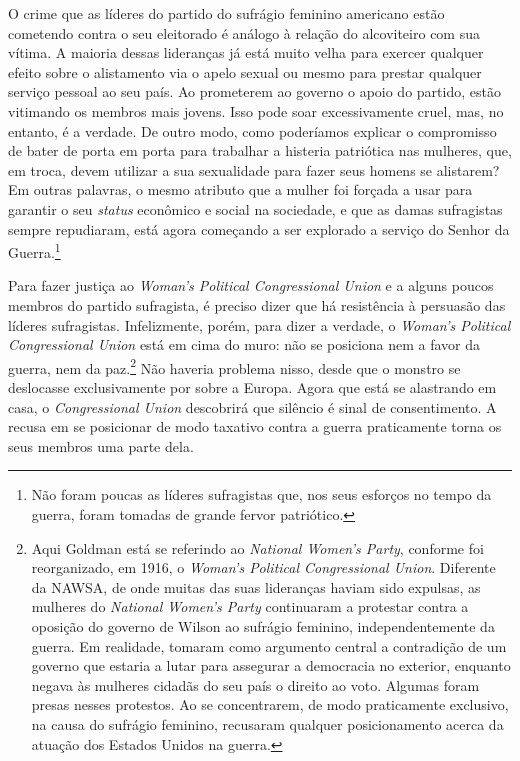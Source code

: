 O crime que as líderes do partido do sufrágio feminino americano estão
cometendo contra o seu eleitorado é análogo à relação do alcoviteiro com
sua vítima. A maioria dessas lideranças já está muito velha para exercer
qualquer efeito sobre o alistamento via o apelo sexual ou mesmo para
prestar qualquer serviço pessoal ao seu país. Ao prometerem ao governo o
apoio do partido, estão vitimando os membros mais jovens. Isso pode soar
excessivamente cruel, mas, no entanto, é a verdade. De outro modo, como
poderíamos explicar o compromisso de bater de porta em porta para
trabalhar a histeria patriótica nas mulheres, que, em troca, devem
utilizar a sua sexualidade para fazer seus homens se alistarem? Em
outras palavras, o mesmo atributo que a mulher foi forçada a usar para
garantir o seu \emph{status} econômico e social na sociedade, e que as
damas sufragistas sempre repudiaram, está agora começando a ser
explorado a serviço do Senhor da Guerra.\footnote{Não foram poucas as
  líderes sufragistas que, nos seus esforços no tempo da guerra, foram
  tomadas de grande fervor patriótico.}

Para fazer justiça ao \emph{Woman's Political Congressional Union} e a
alguns poucos membros do partido sufragista, é preciso dizer que há
resistência à persuasão das líderes sufragistas. Infelizmente, porém,
para dizer a verdade, o \emph{Woman's Political Congressional Union}
está em cima do muro: não se posiciona nem a favor da guerra, nem da
paz.\footnote{Aqui Goldman está se referindo ao \emph{National Women's
  Party}, conforme foi reorganizado, em 1916, o \emph{Woman's Political
  Congressional Union}. Diferente da NAWSA, de onde muitas das suas
  lideranças haviam sido expulsas, as mulheres do \emph{National Women's
  Party} continuaram a protestar contra a oposição do governo de Wilson
  ao sufrágio feminino, independentemente da guerra. Em realidade,
  tomaram como argumento central a contradição de um governo que estaria
  a lutar para assegurar a democracia no exterior, enquanto negava às
  mulheres cidadãs do seu país o direito ao voto. Algumas foram presas
  nesses protestos. Ao se concentrarem, de modo praticamente exclusivo,
  na causa do sufrágio feminino, recusaram qualquer posicionamento
  acerca da atuação dos Estados Unidos na guerra.} Não haveria problema
nisso, desde que o monstro se deslocasse exclusivamente por sobre a
Europa. Agora que está se alastrando em casa, o \emph{Congressional
Union} descobrirá que silêncio é sinal de consentimento. A recusa em se
posicionar de modo taxativo contra a guerra praticamente torna os seus
membros uma parte dela.

